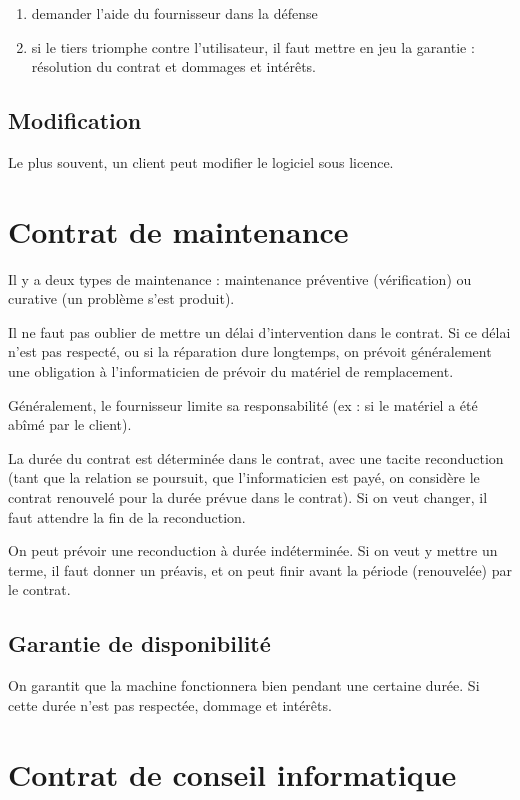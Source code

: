 		\begin{enumerate}
			\item demander l'aide du fournisseur dans la défense
			\item si le tiers triomphe contre l'utilisateur, il faut mettre en jeu la garantie : résolution du contrat et dommages et intérêts.
		\end{enumerate}
		
		\subsection{Modification}
		
		Le plus souvent, un client peut modifier le logiciel sous licence.
		
	\section{Contrat de maintenance}
	
	Il y a deux types de maintenance : maintenance préventive (vérification) ou curative (un problème s'est produit).
	
	
	Il ne faut pas oublier de mettre un délai d'intervention dans le contrat. Si ce délai n'est pas respecté, ou si la réparation dure longtemps, on prévoit généralement une obligation à l'informaticien de prévoir du matériel de remplacement.
	
	Généralement, le fournisseur limite sa responsabilité (ex : si le matériel a été abîmé par le client).
	
	La durée du contrat est déterminée dans le contrat, avec une tacite reconduction (tant que la relation se poursuit, que l'informaticien est payé, on considère le contrat renouvelé pour la durée prévue dans le contrat). Si on veut changer, il faut attendre la fin de la reconduction.
	
	On peut prévoir une reconduction à durée indéterminée. Si on veut y mettre un terme, il faut donner un préavis, et on peut finir avant la période (renouvelée) par le contrat.
	
		\subsection{Garantie de disponibilité}
		
		On garantit que la machine fonctionnera bien pendant une certaine durée. Si cette durée n'est pas respectée, dommage et intérêts.
	
	
	\section{Contrat de conseil informatique}
	
